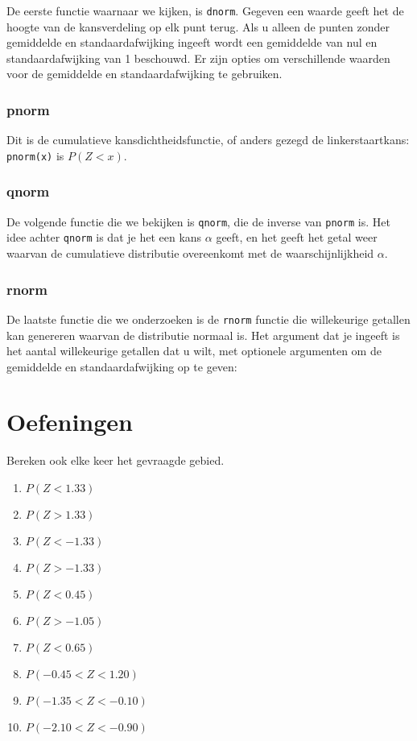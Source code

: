 De eerste functie waarnaar we kijken, is \texttt{dnorm}. Gegeven een waarde geeft het de hoogte van de kansverdeling op elk punt terug. Als u alleen de punten zonder gemiddelde en standaardafwijking ingeeft wordt een gemiddelde van nul en standaardafwijking van 1 beschouwd. Er zijn opties om verschillende waarden voor de gemiddelde en standaardafwijking te gebruiken.

%

\subsubsection{pnorm}

Dit is de cumulatieve kansdichtheidsfunctie, of anders gezegd de linkerstaartkans: \texttt{pnorm(x)} is $P(Z < x)$.

\subsubsection{qnorm}
De volgende functie die we bekijken is \texttt{qnorm}, die de inverse van \texttt{pnorm} is. Het idee achter \texttt{qnorm} is dat je het een kans $\alpha$ geeft, en het geeft het getal weer waarvan de cumulatieve distributie overeenkomt met de waarschijnlijkheid $\alpha$.

\subsubsection{rnorm}

%
De laatste functie die we onderzoeken is de \texttt{rnorm} functie die willekeurige getallen kan genereren waarvan de distributie normaal is. Het argument dat je ingeeft is het aantal willekeurige getallen dat u wilt, met optionele argumenten om de gemiddelde en standaardafwijking op te geven:

%

\section{Oefeningen}
\label{sec:steekproefonderzoek-oefeningen}

\begin{exercise}
  \label{ex:prob-norm-dist}
  Bereken ook elke keer het gevraagde gebied.
  \begin{enumerate}[label=\alph*.]
    \item $P(Z < 1.33)$
    \item $P(Z > 1.33)$
    \item $P(Z < -1.33)$
    \item $P(Z > -1.33)$
    \item $P(Z < 0.45)$
    \item $P(Z > -1.05)$
    \item $P(Z < 0.65)$
    \item $P(-0.45 < Z < 1.20)$
    \item $P(-1.35 < Z < -0.10)$
    \item $P(-2.10 < Z < -0.90)$
  \end{enumerate}
\end{exercise}

